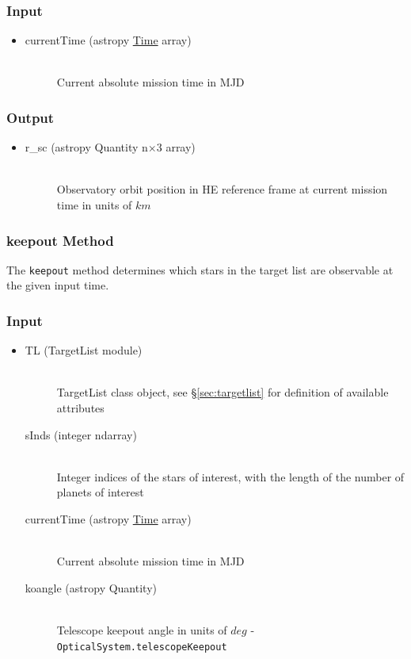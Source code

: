 \documentclass[cleanfoot]{asme2ej}
\begin{document}
\subsubsection*{Input}
\begin{itemize}
\item
\begin{description}
    \item[currentTime (astropy \href{http://astropy.readthedocs.org/en/latest/time/index.html}{Time} array)] \hfill \\ Current absolute mission time in MJD
\end{description}
\end{itemize}

\subsubsection*{Output}
\begin{itemize}
\item
\begin{description}
    \item[r\_sc (astropy Quantity n$\times$3 array)] \hfill \\ Observatory orbit position in HE reference frame at current mission time in units of $ km $
\end{description}
\end{itemize}

\subsubsection{keepout Method} \label{sec:keepouttask} 
The \verb+keepout+ method determines which stars in the target list are observable at the given input time.

\subsubsection*{Input}
\begin{itemize}
\item
\begin{description}
    \item[TL (TargetList module)] \hfill \\ TargetList class object, see \S\ref{sec:targetlist} for definition of available attributes
    \item[sInds (integer ndarray)] \hfill \\ Integer indices of the stars of interest, with the length of the number of planets of interest
    \item[currentTime (astropy \href{http://astropy.readthedocs.org/en/latest/time/index.html}{Time} array)] \hfill \\ Current absolute mission time in MJD
    \item[koangle (astropy Quantity)] \hfill \\ Telescope keepout angle in units of $ deg $ - \verb+OpticalSystem.telescopeKeepout+
\end{description}
\end{itemize}
\end{document}
